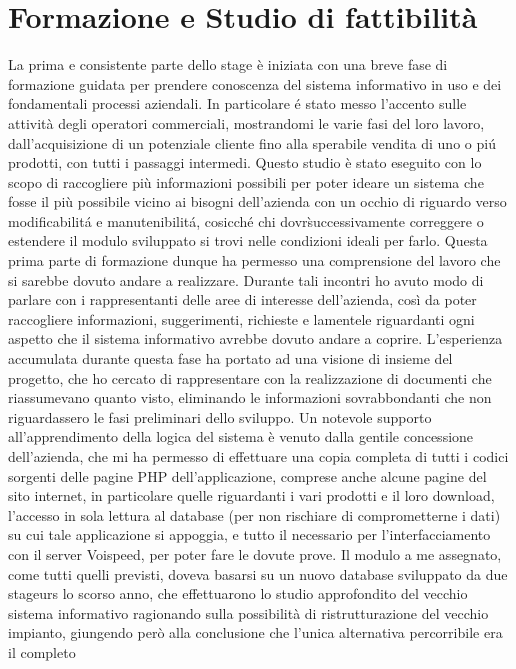 \section{Formazione e Studio di fattibilit\` a}
La prima e consistente parte dello stage \`e iniziata con una breve fase di formazione guidata per prendere 
conoscenza del sistema informativo in uso e dei fondamentali processi aziendali. In particolare \'e stato messo l'accento
sulle attivit\`a degli operatori commerciali, mostrandomi le varie fasi del loro lavoro, dall'acquisizione di un potenziale
 cliente fino alla sperabile vendita di uno o pi\'u prodotti, con tutti i passaggi intermedi.
Questo studio \`e stato eseguito con lo scopo di raccogliere pi\`u informazioni possibili per poter ideare un sistema 
che fosse il pi\`u possibile vicino ai bisogni dell'azienda con un occhio di riguardo verso modificabilit\'a e manutenibilit\'a, 
cosicch\'e chi dovr\` successivamente correggere o estendere il modulo sviluppato si trovi nelle condizioni ideali per farlo.
Questa prima parte di formazione dunque ha permesso una comprensione del lavoro che si sarebbe dovuto andare a realizzare. 
Durante tali incontri ho avuto modo di parlare con i rappresentanti delle aree di interesse dell'azienda, così da
poter raccogliere informazioni, suggerimenti, richieste e lamentele riguardanti ogni aspetto che il sistema informativo 
avrebbe dovuto andare a coprire. L'esperienza accumulata durante questa fase ha portato ad una visione di insieme del 
progetto, che ho cercato di rappresentare con la realizzazione di documenti che riassumevano quanto visto, 
eliminando le informazioni sovrabbondanti che non riguardassero le fasi preliminari dello sviluppo.
Un notevole supporto all'apprendimento della logica del sistema \`e venuto dalla gentile concessione dell'azienda,
 che mi ha permesso di effettuare una copia completa di tutti i codici sorgenti delle pagine PHP dell'applicazione, comprese
anche alcune pagine del sito internet, in particolare quelle riguardanti i vari prodotti e il loro download, l'accesso in 
sola lettura al database (per non rischiare di comprometterne i dati) su cui tale applicazione si appoggia, e tutto il necessario
per l'interfacciamento con il server Voispeed, per poter fare le dovute prove. 
Il modulo a me assegnato, come tutti quelli previsti, doveva basarsi su un nuovo database sviluppato da due stageurs 
lo scorso anno, che effettuarono lo studio approfondito del vecchio sistema informativo ragionando sulla possibilit\`a di 
ristrutturazione del vecchio impianto, giungendo per\`o alla conclusione che l'unica alternativa percorribile era il completo 
